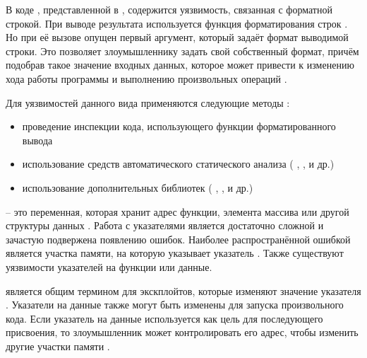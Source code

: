 %
В коде , представленной в , содержится уязвимость, связанная с форматной строкой.
%
При выводе результата используется функция форматирования строк . 
%
Но при её вызове опущен первый аргумент, который задаёт формат выводимой строки. 
%
Это позволяет злоумышленнику задать свой собственный формат, причём подобрав такое значение входных данных, которое может привести к изменению хода работы программы и выполнению произвольных операций . 

%
Для  уязвимостей данного вида применяются следующие методы  : 
\begin{itemize}

	\item проведение инспекции кода, использующего функции форматированного вывода 
	
	\item использование средств автоматического статического анализа ( ,  ,   и др.) 
	
	\item использование дополнительных библиотек ( ,  ,   и др.) 
\end{itemize}



%
 -- это переменная, которая хранит адрес функции, элемента массива или другой структуры данных . 
%
Работа с указателями является достаточно сложной и зачастую подвержена появлению ошибок. 
%
Наиболее распространённой ошибкой является  участка памяти, на которую указывает указатель . 
%
Также существуют уязвимости указателей на функции или данные.

%
 является общим термином для экскплойтов, которые изменяют значение указателя . 
%
Указатели на данные также могут быть изменены для запуска произвольного кода. 
%
Если указатель на данные используется как цель для последующего присвоения, то злоумышленник может контролировать его адрес, чтобы изменить другие участки памяти . 

